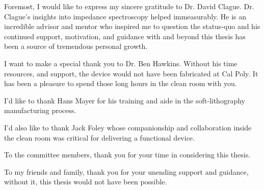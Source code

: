 
\mbox

\\

\par Foremost, I would like to express my sincere gratitude to Dr. David Clague. Dr. Clague's insights into impedance spectroscopy helped immeasurably. He is an incredible advisor and mentor who inspired me to question the status-quo and his continued support, motivation, and guidance with and beyond this thesis has been a source of tremendous personal growth.
\\
\par I want to make a special thank you to Dr. Ben Hawkins. Without his time resources, and support, the device would not have been fabricated at Cal Poly. It has been a pleasure to spend those long hours in the clean room with you.
\\
\par I'd like to thank Hans Mayer for his training and aide in the soft-lithography manufacturing process.
\\
\par I'd also like to thank Jack Foley whose companionship and collaboration inside the clean room was critical for delivering a functional device. 
\\
\par To the committee members, thank you for your time in considering this thesis.  
\\
\par To my friends and family, thank you for your unending support and guidance, without it, this thesis would not have been possible. 



